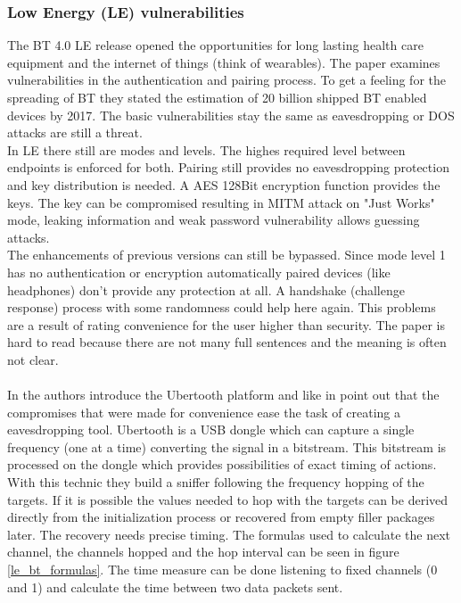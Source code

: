 \documentclass[12pt,a4paper]{article}
\begin{document}
\subsubsection{Low Energy (LE) vulnerabilities}
The BT 4.0 LE release opened the opportunities for long lasting health care equipment and the internet of things (think of wearables). The paper \cite{DBLP:conf/greencom/XuZLMLCSTY13} examines vulnerabilities in the authentication and pairing process. To get a feeling for the spreading of BT they stated the estimation of 20 billion shipped BT enabled devices by 2017. The basic vulnerabilities stay the same as eavesdropping or DOS attacks are still a threat. \\
In LE there still are modes and levels. The highes required level between endpoints is enforced for both. Pairing still provides no eavesdropping protection and key distribution is needed. A AES 128Bit encryption function provides the keys. The key can be compromised resulting in MITM attack on "Just Works" mode, leaking information and weak password vulnerability allows guessing attacks. \\
The enhancements of previous versions can still be bypassed. Since mode level 1 has no authentication or encryption automatically paired devices (like headphones) don't provide any protection at all. A handshake (challenge response) process with some randomness could help here again. This problems are a result of rating convenience for the user higher than security.
The paper is hard to read because there are not many full sentences and the meaning is often not clear.\\
\\
In \cite{DBLP:conf/woot/Ryan13} the authors introduce the Ubertooth platform and like in \cite{DBLP:conf/greencom/XuZLMLCSTY13}  point out that the compromises that were made for convenience ease the task of creating a eavesdropping tool. Ubertooth is a USB dongle which can capture a single frequency (one at a time) converting the signal in a bitstream. This bitstream is processed on the dongle which provides possibilities of exact timing of actions. With this technic they build a sniffer following the frequency hopping of the targets. If it is possible the values needed to hop with the targets can be derived directly from the initialization process or recovered from empty filler packages later. The recovery needs precise timing. The formulas used to calculate the next channel, the channels hopped and the hop interval can be seen in figure \ref{le_bt_formulas}. The time measure can be done listening to fixed channels (0 and 1) and calculate the time between two data packets sent.
\end{document}
